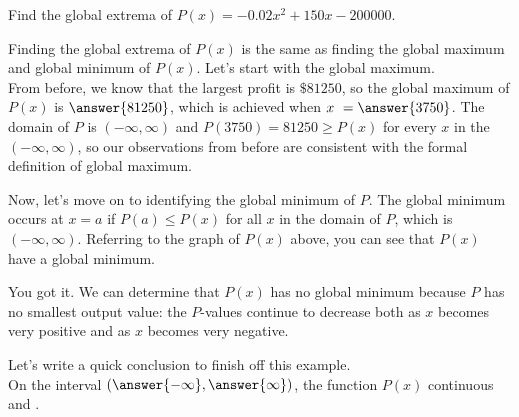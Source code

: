 \documentclass{ximera}
\begin{document}
\begin{example}
Find the global extrema of $P(x) = -0.02x^2 + 150x-200000$.
\begin{explanation}
Finding the global extrema of $P(x)$ is the same as finding the global maximum and global minimum of $P(x)$.  Let's start with the global maximum.  \\

From before, we know that the largest profit is $\$81250$, so the global maximum of $P(x)$ is $\answer{81250}$, which is achieved when $x \ = \answer{3750}$.  The domain of $P$ is $(-\infty, \infty)$ and $P(3750) = 81250 \geq P(x)$ for every $x$ in the $(-\infty, \infty)$, so our observations from before are consistent with the formal definition of global maximum. \\

\begin{explanation}

Now, let's move on to identifying the global minimum of $P$.  The global minimum occurs at $x=a$ if $P(a) \leq P(x)$ for all $x$ in the domain of $P$, which is $(-\infty, \infty)$.  Referring to the graph of $P(x)$ above, you can see that $P(x)$  have a global minimum. 

\begin{feedback}[correct]
You got it.  We can determine that $P(x)$ has no global minimum because $P$ has no smallest output value: the $P$-values continue to decrease both as $x$ becomes very positive and as $x$ becomes very negative. 
\end{feedback}

\begin{explanation}

Let's write a quick conclusion to finish off this example. \\

On the  interval $\left( \answer{-\infty}, \answer{\infty} \right)$, the function $P(x)$  continuous and .


\end{explanation}

\end{explanation}

\end{explanation}

\end{example}
\end{document}
